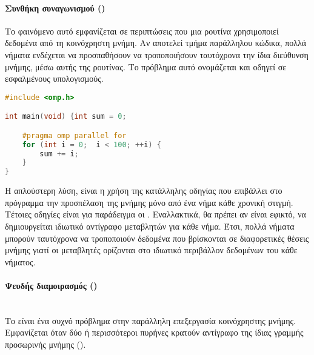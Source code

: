 \paragraph{Συνθήκη συναγωνισμού ()}
\begin{center}
\begin{minipage}[t]{0.45\linewidth}
Το φαινόμενο αυτό εμφανίζεται σε περιπτώσεις που μια ρουτίνα χρησιμοποιεί δεδομένα από τη κοινόχρηστη μνήμη. Αν
αποτελεί τμήμα παράλληλου κώδικα, πολλά νήματα ενδέχεται να προσπαθήσουν να τροποποιήσουν ταυτόχρονα την ίδια διεύθυνση
μνήμης, μέσω αυτής της ρουτίνας. Το πρόβλημα αυτό ονομάζεται \emph{} και οδηγεί σε εσφαλμένους
υπολογισμούς. 
	\end{minipage}
	\qquad
	\begin{minipage}[t]{0.47\linewidth}
\begin{spacing}{1.1}
\begin{lstlisting}[tabsize=2, basicstyle=\small, language=C++, caption={\el{Παράδειγμα συνθήκης συναγωνισμού}}, frame=tb]
#include <omp.h>

int main(void) {int sum = 0;

	#pragma omp parallel for
	for (int i = 0;  i < 100; ++i) {
		sum += i;		
	}
}
\end{lstlisting}
\end{spacing}
	\end{minipage}
\end{center}
\par
Η απλούστερη λύση, είναι η χρήση της κατάλληλης οδηγίας που επιβάλλει στο πρόγραμμα την προσπέλαση της
μνήμης μόνο από ένα νήμα κάθε χρονική στιγμή. Τέτοιες οδηγίες είναι για παράδειγμα οι \emph{}. Εναλλακτικά, θα πρέπει αν είναι εφικτό, να δημιουργείται ιδιωτικό αντίγραφο μεταβλητών για κάθε
νήμα. Έτσι, πολλά νήματα μπορούν ταυτόχρονα να τροποποιούν δεδομένα που βρίσκονται σε διαφορετικές θέσεις μνήμης γιατί
οι μεταβλητές ορίζονται στο ιδιωτικό περιβάλλον δεδομένων του κάθε νήματος.
\clearpage
\paragraph{Ψευδής διαμοιρασμός ()}
\ \\
Το \emph{} είναι ένα συχνό πρόβλημα στην παράλληλη επεξεργασία κοινόχρηστης μνήμης. Εμφανίζεται όταν
δύο ή περισσότεροι πυρήνες κρατούν αντίγραφο της ίδιας γραμμής προσωρινής μνήμης (\emph{}). 

